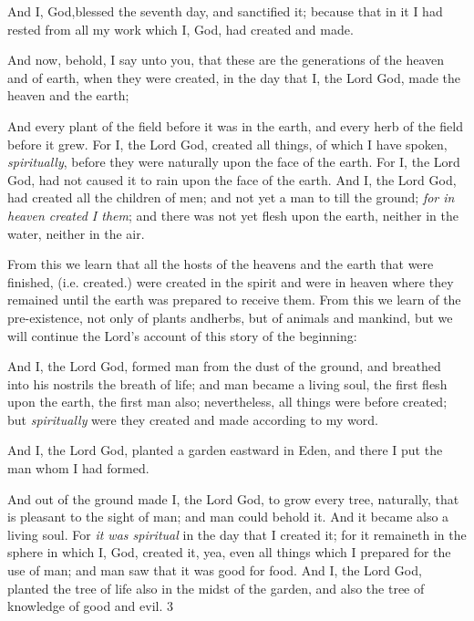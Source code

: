 And I, God,blessed the seventh day, and sanctified it; because that in it I had rested from all
my work which I, God, had created and made.

And now, behold, I say unto you, that these are the generations of the heaven and of earth,
when they were created, in the day that I, the Lord God, made the heaven and the earth;

And every plant of the field before it was in the earth, and every herb of the field before it
grew. For I, the Lord God, created all things, of which I have spoken, \textit{spiritually}, before they
were naturally upon the face of the earth. For I, the Lord God, had not caused it to rain upon
the face of the earth. And I, the Lord God, had created all the children of men; and not yet a
man to till the ground; \textit{for in heaven created I them}; and there was not yet flesh upon the
earth, neither in the water, neither in the air.

From this we learn that all the hosts of the heavens and the earth that were finished, (i.e.
created.) were created in the spirit and were in heaven where they remained until the earth
was prepared to receive them. From this we learn of the pre-existence, not only of plants andherbs, but of animals and mankind, but we will continue the Lord's account of this story of
the beginning:

And I, the Lord God, formed man from the dust of the ground, and breathed into his nostrils
the breath of life; and man became a living soul, the first flesh upon the earth, the first man
also; nevertheless, all things were before created; but \textit{spiritually} were they created and made
according to my word.

And I, the Lord God, planted a garden eastward in Eden, and there I put the man whom I had
formed.

And out of the ground made I, the Lord God, to grow every tree, naturally, that is pleasant to
the sight of man; and man could behold it. And it became also a living soul. For \textit{it was
spiritual} in the day that I created it; for it remaineth in the sphere in which I, God, created it,
yea, even all things which I prepared for the use of man; and man saw that it was good for
food. And I, the Lord God, planted the tree of life also in the midst of the garden, and also the
tree of knowledge of good and evil. 3

